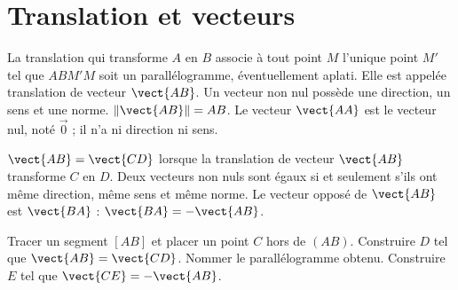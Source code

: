 \section{Translation et vecteurs}
\begin{keypoint}[Définition]
La translation qui transforme $A$ en $B$ associe à tout point $M$ l'unique point $M'$ tel que $ABM'M$ soit un parallélogramme, éventuellement aplati. Elle est appelée translation de vecteur $\vect{AB}$.
Un vecteur non nul possède une direction, un sens et une norme. $\|\vect{AB}\|=AB$. Le vecteur $\vect{AA}$ est le vecteur nul, noté $\vec0$ ; il n'a ni direction ni sens.
\end{keypoint}
\begin{center}\end{center}
\begin{keypoint}
$\vect{AB}=\vect{CD}$ lorsque la translation de vecteur $\vect{AB}$ transforme $C$ en $D$. Deux vecteurs non nuls sont égaux si et seulement s'ils ont même direction, même sens et même norme.
Le vecteur opposé de $\vect{AB}$ est $\vect{BA}$ : $\vect{BA}=-\vect{AB}$.
\end{keypoint}
\begin{example}Tracer un segment $[AB]$ et placer un point $C$ hors de $(AB)$. Construire $D$ tel que $\vect{AB}=\vect{CD}$. Nommer le parallélogramme obtenu. Construire $E$ tel que $\vect{CE}=-\vect{AB}$.\end{example}

